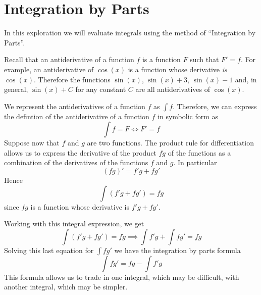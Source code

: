 \documentclass[12pt,letterpaper,fleqn]{article}
\theoremstyle{definition}
\begin{document}
\section*{Integration by Parts}
In this exploration we will evaluate integrals using the method of ``Integration by Parts''.

Recall that an antiderivative of a function $f$ is a function $F$ such that $F' = f$. For example, an antiderivative of $\cos(x)$ is a function whose derivative \emph{is} $\cos(x)$. Therefore the functions $\sin(x)$, $\sin(x) + 3$, $\sin(x) - 1$ and, in general, $\sin(x) + C$ for any constant $C$ are all antiderivatives of $\cos(x)$.

We represent the antiderivatives of a function $f$ as $\int f$. Therefore, we can express the defintion of the antiderivative of a function $f$ in symbolic form as
\begin{equation*}
  \int f = F \iff F' = f
\end{equation*}
Suppose now that $f$ and $g$ are two functions. The product rule for differentiation allows us to express the derivative of the product $fg$ of the functions as a combination of the derivatives of the functions $f$ and $g$. In particular
\begin{equation*}
  (fg)' = f'g + fg'
\end{equation*}
Hence
\begin{equation*}
  \int(f'g + fg') = fg
\end{equation*}
since $fg$ is a function whose derivative is $f'g + fg'$.

Working with this integral expression, we get
\begin{equation*}
  \int(f'g + fg') = fg \implies \int f'g + \int fg' = fg
\end{equation*}
Solving this last equation for $\int fg'$ we have the integration by parts formula
\begin{equation*}
  \int fg' = fg - \int f'g
\end{equation*}
This formula allows us to trade in one integral, which may be difficult, with another integral, which may be simpler.
\end{document}
